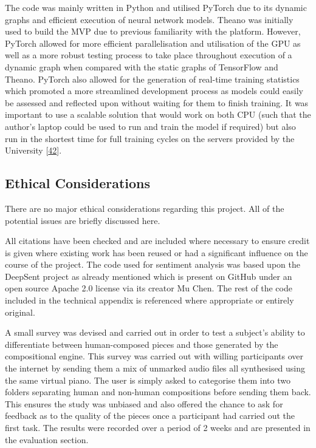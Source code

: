 \documentclass[12pt,]{article}
\begin{document}
The code was mainly written in Python and utilised PyTorch due to its
dynamic graphs and efficient execution of neural network models. Theano
was initially used to build the MVP due to previous familiarity with the
platform. However, PyTorch allowed for more efficient parallelisation
and utilisation of the GPU as well as a more robust testing process to
take place throughout execution of a dynamic graph when compared with
the static graphs of TensorFlow and Theano. PyTorch also allowed for the
generation of real-time training statistics which promoted a more
streamlined development process as models could easily be assessed and
reflected upon without waiting for them to finish training. It was
important to use a scalable solution that would work on both CPU (such
that the author's laptop could be used to run and train the model if
required) but also run in the shortest time for full training cycles on
the servers provided by the University
{[}\protect\hyperlink{ref-warwickcomputenodes}{42}{]}.

\hypertarget{ethical-considerations}{%
\subsection{Ethical Considerations}\label{ethical-considerations}}

There are no major ethical considerations regarding this project. All of
the potential issues are briefly discussed here.

All citations have been checked and are included where necessary to
ensure credit is given where existing work has been reused or had a
significant influence on the course of the project. The code used for
sentiment analysis was based upon the DeepSent project as already
mentioned which is present on GitHub under an open source Apache 2.0
license via its creator Mu Chen. The rest of the code included in the
technical appendix is referenced where appropriate or entirely original.

A small survey was devised and carried out in order to test a subject's
ability to differentiate between human-composed pieces and those
generated by the compositional engine. This survey was carried out with
willing participants over the internet by sending them a mix of unmarked
audio files all synthesised using the same virtual piano. The user is
simply asked to categorise them into two folders separating human and
non-human compositions before sending them back. This ensures the study
was unbiased and also offered the chance to ask for feedback as to the
quality of the pieces once a participant had carried out the first task.
The results were recorded over a period of 2 weeks and are presented in
the evaluation section.
\end{document}
